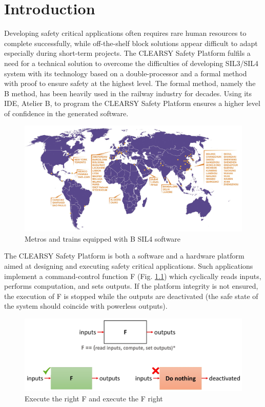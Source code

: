 \chapter{Introduction}

Developing safety critical applications often requires rare human resources to complete successfully, while off-the-shelf block solutions appear difficult to adapt especially during short-term projects. The CLEARSY Safety Platform fulfils a need for a technical solution to overcome the difficulties of developing SIL3/SIL4 system with its technology based on a double-processor and a formal method with proof to ensure safety at the highest level\cite{lecomte2016double}. The formal method, namely the B method\cite{Abrial.1996}, has been heavily used in the railway industry for decades\cite{DBLP:conf/fmics/Lecomte09}\cite{DBLP:conf/fm/Lecomte08}\cite{DBLP:journals/entcs/Benveniste11}. Using its IDE, Atelier B, to program the CLEARSY Safety Platform ensures a higher level of confidence in the generated software.\\

\begin{figure}[h]
\centering\includegraphics[scale=0.5]{Pictures/INTRO-AtelierB.jpg}
\caption{Metros and trains equipped with B SIL4 software}
\end{figure}

The CLEARSY Safety Platform is both a software and a hardware platform aimed at designing and executing safety critical applications. Such applications implement a command-control function F (Fig. \ref{intro:F}) which cyclically reads inputs, performs computation, and sets outputs. If the platform integrity is not ensured, the execution of F is stopped while the outputs are deactivated (the safe state of the system should coincide with powerless outputs). 

\begin{figure}[h]
\centering\includegraphics[scale=0.2]{Pictures/Fnew.jpg}
\caption{Execute the right F and execute the F right}
\label{intro:F}
\end{figure}


